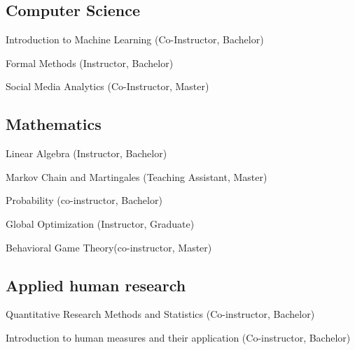 \documentclass[letter,10pt]{article}
\begin{document}
\subsection{Computer Science }
\begin{zitemize}
\item Introduction to Machine Learning \hfill(Co-Instructor, Bachelor)
\item Formal Methods \hfill(Instructor, Bachelor)
\item Social Media Analytics \hfill(Co-Instructor, Master)
\end{zitemize}


\subsection{Mathematics}
\begin{zitemize}
\item Linear Algebra \hfill (Instructor, Bachelor)
\item Markov Chain and Martingales \hfill (Teaching Assistant, Master)
\item Probability \hfill (co-instructor, Bachelor)
\item Global Optimization \hfill (Instructor, Graduate)
\item Behavioral Game Theory\hfill(co-instructor, Master)
\end{zitemize}



\subsection{Applied human research}
\begin{zitemize}
\item Quantitative Research Methods and Statistics \hfill(Co-instructor, Bachelor)
\item Introduction to human measures and their application \hfill (Co-instructor, Bachelor)
\end{zitemize}


\end{document}
